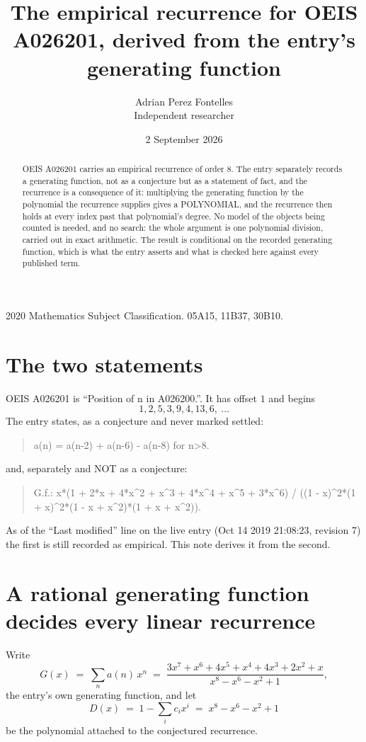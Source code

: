 \documentclass[11pt,a4paper]{article}
\title{The empirical recurrence for OEIS A026201, derived from the entry's generating function}
\author{Adrian Perez Fontelles\\ \small Independent researcher}
\date{2 September 2026}
\theoremstyle{plain}
\theoremstyle{definition}
\begin{document}
\maketitle

\begin{abstract}
OEIS A026201 carries an empirical recurrence of order $8$. The entry separately records a
generating function, not as a conjecture but as a statement of fact, and the recurrence is a
consequence of it: multiplying the generating function by the polynomial the recurrence
supplies gives a POLYNOMIAL, and the recurrence then holds at every index past that
polynomial's degree. No model of the objects being counted is needed, and no search: the
whole argument is one polynomial division, carried out in exact arithmetic. The result is
conditional on the recorded generating function, which is what the entry asserts and what is
checked here against every published term.
\end{abstract}

\noindent\small 2020 Mathematics Subject Classification. 05A15, 11B37, 30B10.\normalsize

\section{The two statements}

OEIS A026201 is ``Position of n in A026200.''. It has offset $1$ and begins
\[
1, 2, 5, 3, 9, 4, 13, 6,\ \dots
\]
The entry states, as a conjecture and never marked settled:
\begin{quote}
a(n) = a(n-2) + a(n-6) - a(n-8) for n>8.
\end{quote}
and, separately and NOT as a conjecture:
\begin{quote}
G.f.: x*(1 + 2*x + 4*x\^{}2 + x\^{}3 + 4*x\^{}4 + x\^{}5 + 3*x\^{}6) / ((1 - x)\^{}2*(1 + x)\^{}2*(1 - x + x\^{}2)*(1 + x + x\^{}2)).
\end{quote}
As of the ``Last modified'' line on the live entry (Oct 14 2019 21:08:23, revision 7) the first is still
recorded as empirical. This note derives it from the second.

\section{A rational generating function decides every linear recurrence}

Write
\[
G(x)\;=\;\sum_{n}a(n)\,x^{n}\;=\;\frac{3 x^{7} + x^{6} + 4 x^{5} + x^{4} + 4 x^{3} + 2 x^{2} + x}{x^{8} - x^{6} - x^{2} + 1},
\]
the entry's own generating function, and let
\[
D(x)\;=\;1-\sum_i c_i x^{i}\;=\;x^{8} - x^{6} - x^{2} + 1
\]
be the polynomial attached to the conjectured recurrence.
\end{document}
